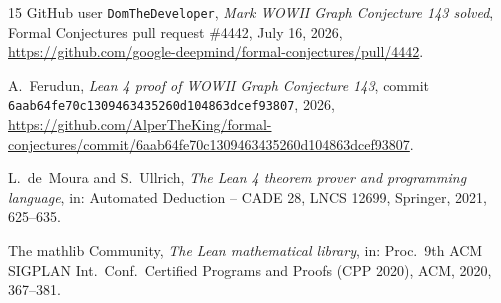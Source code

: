 \documentclass[11pt]{article}
\numberwithin{equation}{section}
\theoremstyle{remark}
\begin{document}
\begin{thebibliography}{15}
GitHub user \texttt{DomTheDeveloper},
\emph{Mark WOWII Graph Conjecture 143 solved},
Formal Conjectures pull request \#4442, July 16, 2026,
\url{https://github.com/google-deepmind/formal-conjectures/pull/4442}.

A.~Ferudun,
\emph{Lean 4 proof of WOWII Graph Conjecture 143},
commit \texttt{6aab64fe70c1309463435260d104863dcef93807}, 2026,
\url{https://github.com/AlperTheKing/formal-conjectures/commit/6aab64fe70c1309463435260d104863dcef93807}.


L.~de~Moura and S.~Ullrich,
\emph{The Lean 4 theorem prover and programming language},
in: Automated Deduction -- CADE 28, LNCS 12699, Springer, 2021, 625--635.

The mathlib Community,
\emph{The Lean mathematical library},
in: Proc.\ 9th ACM SIGPLAN Int.\ Conf.\ Certified Programs and Proofs
(CPP 2020), ACM, 2020, 367--381.

\end{thebibliography}
\end{document}
